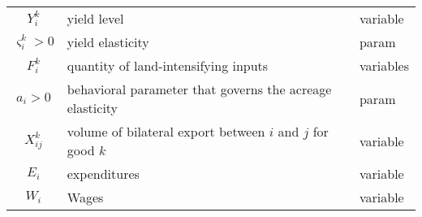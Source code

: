 \begin{tabular}{c|l|l}
    $Y_i^k$                                     & yield level                                                        & variable                 \\

    $\varsigma_i^k > 0$                         & yield elasticity                                                   & param                    \\

    $F_i^k$                                     & quantity of land-intensifying inputs                               & variables                \\

    $a_i > 0$                                   & behavioral parameter that governs the acreage elasticity           & param                    \\

    $X_{ij}^k$                                  & volume of bilateral export between $i$ and $j$ for good $k$        & variable                 \\

    $E_i$                                       & expenditures                                                       & variable                 \\

    $W_i$                                       & Wages                                                              & variable                 \\
\end{tabular}